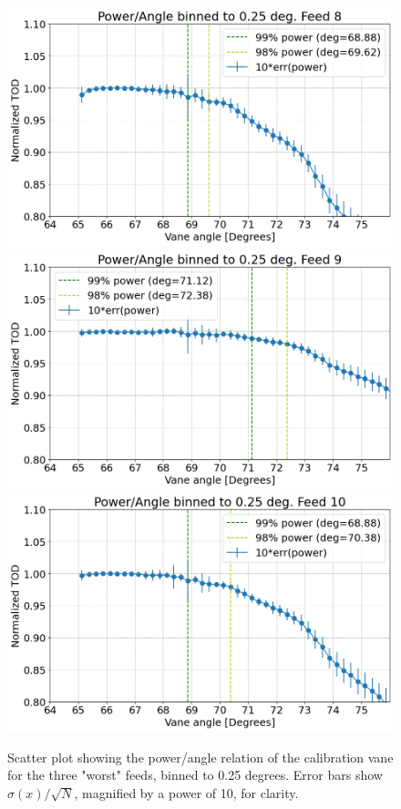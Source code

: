\documentclass[10pt, a4paper]{article}
\begin{document}
\begin{figure}[h!]
    \centering
    \includegraphics[scale=0.45]{../binned8.png}
    \includegraphics[scale=0.45]{../binned9.png}
    \includegraphics[scale=0.45]{../binned10.png}
    \caption{Scatter plot showing the power/angle relation of the calibration vane for the three "worst" feeds, binned to 0.25 degrees. Error bars show $\sigma(x)/\sqrt{N}$, magnified by a power of 10, for clarity.}
    \label{}
\end{figure}
\end{document}

